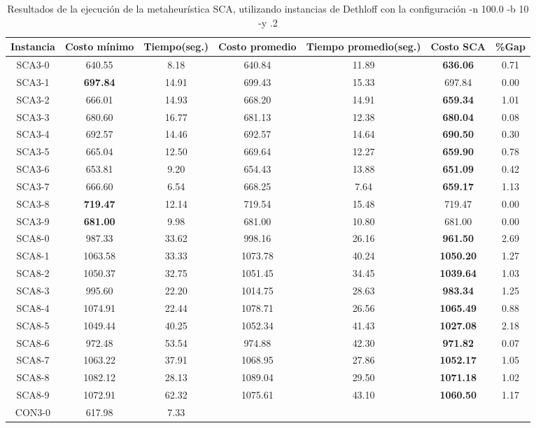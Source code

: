 \begin{table}[ht]
\caption{Resultados de la ejecución de la metaheurística SCA, utilizando instancias de Dethloff con la configuración -n 100.0 -b 10 -y .2}
\centering
\small
\begin{tabular}{c c c c c c c}
\hline\hline
Instancia & Costo mínimo & Tiempo(seg.) & Costo promedio & Tiempo promedio(seg.) & Costo SCA & \%Gap \\ [0.5ex]
\hline
SCA3-0 & 640.55 & 8.18 & 
640.84 & 11.89 & \bf{636.06} & 
0.71\\SCA3-1 & \bf{697.84} & 14.91 & 
699.43 & 15.33 & 697.84 & 0.00\\
SCA3-2 & 666.01 & 14.93 & 
668.20 & 14.91 & \bf{659.34} & 
1.01\\SCA3-3 & 680.60 & 16.77 & 
681.13 & 12.38 & \bf{680.04} & 
0.08\\SCA3-4 & 692.57 & 14.46 & 
692.57 & 14.64 & \bf{690.50} & 
0.30\\SCA3-5 & 665.04 & 12.50 & 
669.64 & 12.27 & \bf{659.90} & 
0.78\\SCA3-6 & 653.81 & 9.20 & 
654.43 & 13.88 & \bf{651.09} & 
0.42\\SCA3-7 & 666.60 & 6.54 & 
668.25 & 7.64 & \bf{659.17} & 
1.13\\SCA3-8 & \bf{719.47} & 12.14 & 
719.54 & 15.48 & 719.47 & 0.00\\
SCA3-9 & \bf{681.00} & 9.98 & 
681.00 & 10.80 & 681.00 & 0.00\\
SCA8-0 & 987.33 & 33.62 & 
998.16 & 26.16 & \bf{961.50} & 
2.69\\SCA8-1 & 1063.58 & 33.33 & 
1073.78 & 40.24 & \bf{1050.20} & 
1.27\\SCA8-2 & 1050.37 & 32.75 & 
1051.45 & 34.45 & \bf{1039.64} & 
1.03\\SCA8-3 & 995.60 & 22.20 & 
1014.75 & 28.63 & \bf{983.34} & 
1.25\\SCA8-4 & 1074.91 & 22.44 & 
1078.71 & 26.56 & \bf{1065.49} & 
0.88\\SCA8-5 & 1049.44 & 40.25 & 
1052.34 & 41.43 & \bf{1027.08} & 
2.18\\SCA8-6 & 972.48 & 53.54 & 
974.88 & 42.30 & \bf{971.82} & 
0.07\\SCA8-7 & 1063.22 & 37.91 & 
1068.95 & 27.86 & \bf{1052.17} & 
1.05\\SCA8-8 & 1082.12 & 28.13 & 
1089.04 & 29.50 & \bf{1071.18} & 
1.02\\SCA8-9 & 1072.91 & 62.32 & 
1075.61 & 43.10 & \bf{1060.50} & 
1.17\\CON3-0 & 617.98 & 7.33 & 

\end{tabular}
\end{table}
